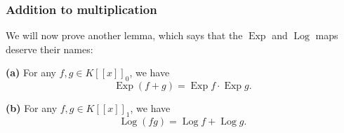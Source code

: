 \subsubsection{Addition to multiplication}

We will now prove another lemma, which says that the $\operatorname*{Exp}$ and
$\operatorname*{Log}$ maps deserve their names:

\begin{lemma}
\label{lem.fps.Exp-Log-additive}\textbf{(a)} For any $f,g\in K\left[  \left[
x\right]  \right]  _{0}$, we have%
\[
\operatorname*{Exp}\left(  f+g\right)  =\operatorname*{Exp}f\cdot
\operatorname*{Exp}g.
\]


\textbf{(b)} For any $f,g\in K\left[  \left[  x\right]  \right]  _{1}$, we
have%
\[
\operatorname*{Log}\left(  fg\right)  =\operatorname*{Log}%
f+\operatorname*{Log}g.
\]

\end{lemma}

